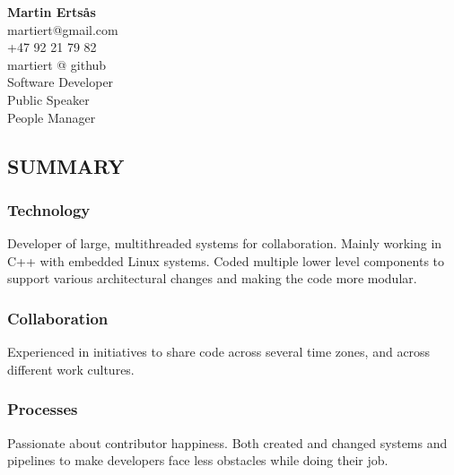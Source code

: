 \documentclass{article}
\begin{document}
\begin{center}

{\large\bf Martin Erts\aa s}\\
\bigskip
martiert@gmail.com\\
+47 92 21 79 82\\
martiert @ github\\
Software Developer\\
Public Speaker\\
People Manager\\
\end{center}

\subsection*{SUMMARY}

\begin{multicols}{2}

  \begin{addmargin}[2em]{0em}
    \subsubsection*{Technology}

    \begin{addmargin}[1em]{0em}
      Developer of large, multithreaded systems for collaboration. Mainly working in C++
      with embedded Linux systems. Coded multiple lower level components to support various
      architectural changes and making the code more modular.
    \end{addmargin}

    \subsubsection*{Collaboration}

    \begin{addmargin}[1em]{0em}
      Experienced in initiatives to share code across several time zones, and across
      different work cultures.
    \end{addmargin}

    \subsubsection*{Processes}

    \begin{addmargin}[1em]{0em}
      Passionate about contributor happiness. Both created and changed systems and pipelines
      to make developers face less obstacles while doing their job.
    \end{addmargin}


\end{addmargin}
\end{multicols}
\end{document}
